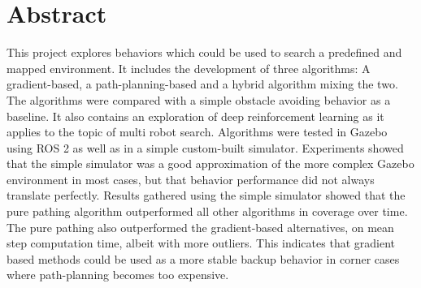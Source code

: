\section*{Abstract}
\label{sec:Abstract}
This project explores behaviors which could be used to search a predefined and mapped environment. It includes the development of three algorithms: A gradient-based, a path-planning-based and a hybrid algorithm mixing the two. The algorithms were compared with a simple obstacle avoiding behavior as a baseline. It also contains an exploration of deep reinforcement learning as it applies to the topic of multi robot search. Algorithms were tested in Gazebo using ROS 2 as well as in a simple custom-built simulator. Experiments showed that the simple simulator was a good approximation of the more complex Gazebo environment in most cases, but that behavior performance did not always translate perfectly. Results gathered using the simple simulator showed that the pure pathing algorithm outperformed all other algorithms in coverage over time. The pure pathing also outperformed the gradient-based alternatives, on mean step computation time, albeit with more outliers. This indicates that gradient based methods could be used as a more stable backup behavior in corner cases where path-planning becomes too expensive.

